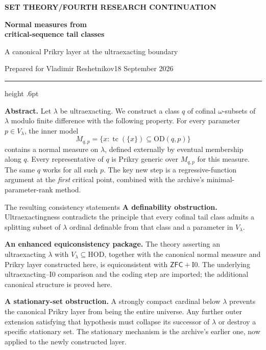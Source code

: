 \documentclass[11pt,letterpaper]{article}
\theoremstyle{definition}
\numberwithin{equation}{section}
\newcommand{\ZFC}{\mathsf{ZFC}}
\newcommand{\HOD}{\mathrm{HOD}}
\newcommand{\OD}{\mathrm{OD}}
\newcommand{\Izero}{\mathrm{I0}}
\newcommand{\tc}{\operatorname{tc}}
\begin{document}
\thispagestyle{empty}
{\sffamily\bfseries\small\color{Olive}SET THEORY\quad /\quad FOURTH RESEARCH CONTINUATION}

\vspace{13pt}
{\fontsize{28}{31}\selectfont\bfseries\color{Forest}Normal measures from\\critical-sequence tail classes\par}
\vspace{10pt}
{\fontsize{14}{18}\selectfont A canonical Prikry layer at the ultraexacting boundary\par}
\vspace{14pt}
{\color{Muted}Prepared for Vladimir Reshetnikov\hfill 18 September 2026\par}
\vspace{3pt}
{\color{Sage}\hrule height .6pt}
\vspace{12pt}

\textbf{Abstract.}
Let $\lambda$ be ultraexacting. We construct a class $q$ of cofinal
$\omega$-subsets of $\lambda$ modulo finite difference with the following
property. For every parameter $p\in V_\lambda$, the inner model
\[
 M_{q,p}=\{x:\tc(\{x\})\subseteq\OD(q,p)\}
\]
contains a normal measure on $\lambda$, defined externally by eventual
membership along $q$. Every representative of $q$ is Prikry generic over
$M_{q,p}$ for this measure. The same $q$ works for all such $p$.
The key new step is a regressive-function argument at the \emph{first}
critical point, combined with the archive's minimal-parameter-rank method.

\begin{assessment}{The resulting consistency statements}
\textbf{A definability obstruction.} Ultraexactingness contradicts the
principle that every cofinal tail class admits a splitting subset of
$\lambda$ ordinal definable from that class and a parameter in $V_\lambda$.

\textbf{An enhanced equiconsistency package.} The theory asserting an
ultraexacting $\lambda$ with $V_\lambda\subseteq\HOD$, together with the
canonical normal measure and Prikry layer constructed here, is
equiconsistent with $\ZFC+\Izero$. The underlying
ultraexacting--$\Izero$ comparison and the coding step are imported;
the additional canonical structure is proved here.

\textbf{A stationary-set obstruction.} A strongly compact cardinal below
$\lambda$ prevents the canonical Prikry layer from being the entire
universe. Any further outer extension satisfying that hypothesis must
collapse its successor of $\lambda$ or destroy a specific stationary set.
The stationary mechanism is the archive's earlier one, now applied to the
newly constructed layer.
\end{assessment}
\end{document}
